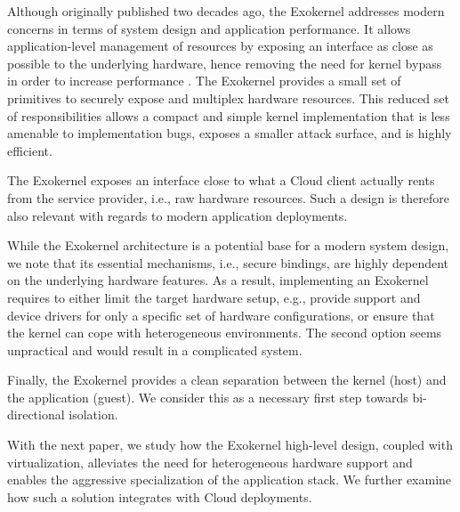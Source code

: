 Although originally published two decades ago, the Exokernel addresses modern concerns in terms of system design and application performance.
It allows application-level management of resources by exposing an interface as close as possible to the underlying hardware, hence removing the need for kernel bypass in order to increase performance \cite{BelayPKGKB14,DBLP:journals/tocs/CaoFKL96}.
The Exokernel provides a small set of primitives to securely expose and multiplex hardware resources.
This reduced set of responsibilities allows a compact and simple kernel implementation that is less amenable to implementation bugs, exposes a smaller attack surface, and is highly efficient.

The Exokernel exposes an interface close to what a Cloud client actually rents from the service provider, i.e., raw hardware resources.
Such a design is therefore also relevant with regards to modern application deployments. 

While the Exokernel architecture is a potential base for a modern system design, we note that its essential mechanisms, i.e., secure bindings, are highly dependent on the underlying hardware features.
As a result, implementing an Exokernel requires to either limit the target hardware setup, e.g., provide support and device drivers for only a specific set of hardware configurations, or ensure that the kernel can cope with heterogeneous environments.
The second option seems unpractical and would result in a complicated system.

Finally, the Exokernel provides a clean separation between the kernel (host) and the application (guest).
We consider this as a necessary first step towards bi-directional isolation.

With the next paper, we study how the Exokernel high-level design, coupled with virtualization, alleviates the need for heterogeneous hardware support and enables the aggressive specialization of the application stack.
We further examine how such a solution integrates with Cloud deployments.



